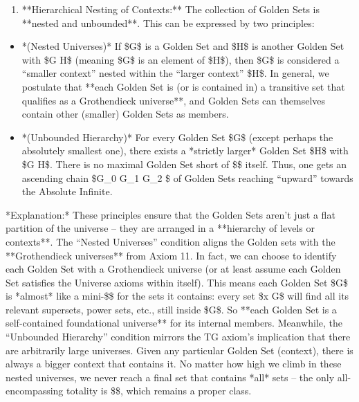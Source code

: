 \documentclass[11pt]{article}
\begin{document}
\begin{enumerate}
  \item **Hierarchical Nesting of Contexts:** The collection of Golden Sets is **nested and unbounded**. This can be expressed by two principles:
\end{enumerate}

\begin{itemize}
  \item *(Nested Universes)* If \$G\$ is a Golden Set and \$H\$ is another Golden Set with \$G \in H\$ (meaning \$G\$ is an element of \$H\$), then \$G\$ is considered a “smaller context” nested within the “larger context” \$H\$. In general, we postulate that **each Golden Set is (or is contained in) a transitive set that qualifies as a Grothendieck universe**, and Golden Sets can themselves contain other (smaller) Golden Sets as members.
  \item *(Unbounded Hierarchy)* For every Golden Set \$G\$ (except perhaps the absolutely smallest one), there exists a *strictly larger* Golden Set \$H\$ with \$G \in H\$. There is no maximal Golden Set short of \$\infty\$ itself. Thus, one gets an ascending chain \$G\_0 \in G\_1 \in G\_2 \in \cdots\$ of Golden Sets reaching “upward” towards the Absolute Infinite.

\end{itemize}
    *Explanation:* These principles ensure that the Golden Sets aren’t just a flat partition of the universe – they are arranged in a **hierarchy of levels or contexts**. The “Nested Universes” condition aligns the Golden sets with the **Grothendieck universes** from Axiom 11. In fact, we can choose to identify each Golden Set with a Grothendieck universe (or at least assume each Golden Set satisfies the Universe axioms within itself). This means each Golden Set \$G\$ is *almost* like a mini-\$\infty\$ for the sets it contains: every set \$x \in G\$ will find all its relevant supersets, power sets, etc., still inside \$G\$. So **each Golden Set is a self-contained foundational universe** for its internal members. Meanwhile, the “Unbounded Hierarchy” condition mirrors the TG axiom’s implication that there are arbitrarily large universes. Given any particular Golden Set (context), there is always a bigger context that contains it. No matter how high we climb in these nested universes, we never reach a final set that contains *all* sets – the only all-encompassing totality is \$\infty\$, which remains a proper class.
\end{document}
